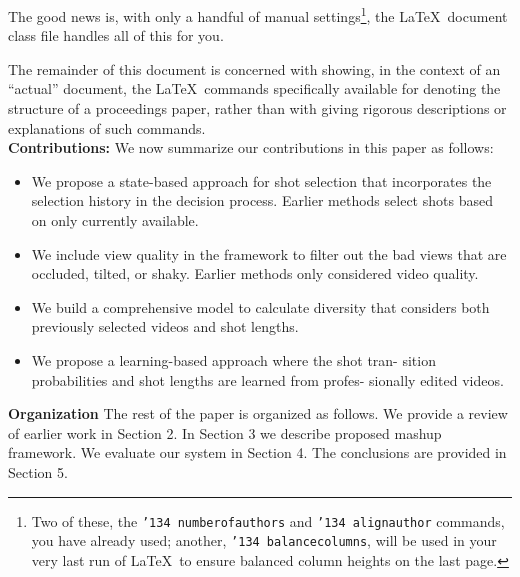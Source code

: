 \documentclass{sig-alternate-05-2015}
\begin{document}
The good news is, with only a handful of manual
settings\footnote{Two of these, the {\texttt{\char'134 numberofauthors}}
and {\texttt{\char'134 alignauthor}} commands, you have
already used; another, {\texttt{\char'134 balancecolumns}}, will
be used in your very last run of \LaTeX\ to ensure
balanced column heights on the last page.}, the \LaTeX\ document
class file handles all of this for you.

The remainder of this document is concerned with showing, in
the context of an ``actual'' document, the \LaTeX\ commands
specifically available for denoting the structure of a
proceedings paper, rather than with giving rigorous descriptions
or explanations of such commands.\\



\textbf{Contributions:} We now summarize our contributions in this paper as follows:\\
\begin{itemize}

\item We propose a state-based approach for shot selection that 
incorporates the selection history in the decision process. Earlier methods select shots based on only currently available.

\item We include view quality in the framework to filter out the
bad views that are occluded, tilted, or shaky. Earlier methods
only considered video quality. 

\item  We build a comprehensive model to calculate diversity that
considers both previously selected videos and shot lengths.
\item We propose a learning-based approach where the shot tran-
sition probabilities and shot lengths are learned from profes-
sionally edited videos.
\end{itemize}
\textbf{Organization} The rest of the paper is organized as follows.
We provide a review of earlier work in Section 2. In Section 3 we
describe proposed mashup framework. We evaluate our system in
Section 4. The conclusions are provided in Section 5.
\end{document}
